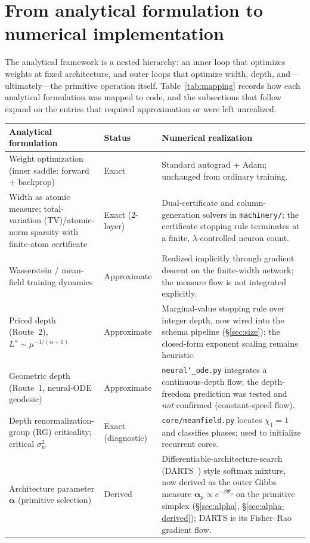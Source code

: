 \documentclass[11pt]{article}
\newcommand{\allowbreakhere}{\discretionary{}{}{}}
\newcommand{\code}[1]{\texttt{\def\_{\char`_\allowbreakhere}#1}}
\newcommand{\alphapar}{\bm{\alpha}}
\begin{document}
\section{From analytical formulation to numerical implementation}
\label{sec:mapping}

The analytical framework is a nested hierarchy: an inner loop that optimizes weights at fixed
architecture, and outer loops that optimize width, depth, and---ultimately---the primitive
operation itself. Table~\ref{tab:mapping} records how each analytical formulation was mapped to
code, and the subsections that follow expand on the entries that required approximation or were
left unrealized.

\begin{table}[t]
\centering
\small
\renewcommand{\arraystretch}{1.25}
\begin{tabular}{p{4.6cm} p{2.1cm} p{6.2cm}}
\toprule
\textbf{Analytical formulation} & \textbf{Status} & \textbf{Numerical realization}\\
\midrule
Weight optimization (inner saddle: forward + backprop) & Exact & Standard autograd + Adam; unchanged from ordinary training.\\
Width as atomic measure; total-variation (TV)/atomic-norm sparsity with finite-atom certificate & Exact (2-layer) & Dual-certificate and column-generation solvers in \code{machinery/}; the certificate stopping rule terminates at a finite, $\lambda$-controlled neuron count.\\
Wasserstein / mean-field training dynamics & Approximate & Realized implicitly through gradient descent on the finite-width network; the measure flow is not integrated explicitly.\\
Priced depth (Route~2), $L^\star\!\sim\!\mu^{-1/(\alpha+1)}$ & Approximate & Marginal-value stopping rule over integer depth, now wired into the schema pipeline (\S\ref{sec:size}); the closed-form exponent scaling remains heuristic.\\
Geometric depth (Route~1, neural-ODE geodesic) & Approximate & \code{neural\_ode.py} integrates a continuous-depth flow; the depth-freedom prediction was tested and \emph{not} confirmed (constant-speed flow).\\
Depth renormalization-group (RG) criticality; critical $\sigma_w^2$ & Exact (diagnostic) & \code{core/meanfield.py} locates $\chi_1\!=\!1$ and classifies phases; used to initialize recurrent cores.\\
Architecture parameter $\alphapar$ (primitive selection) & Derived & Differentiable-architecture-search (DARTS~\cite{liu2019darts}) style softmax mixture, now derived as the outer Gibbs measure $\alphapar_p\propto e^{-\beta\Psi_p}$ on the primitive simplex (\S\ref{sec:alpha}, \S\ref{sec:alpha-derived}); DARTS is its Fisher--Rao gradient flow.\\

\end{tabular}
\end{table}
\end{document}
